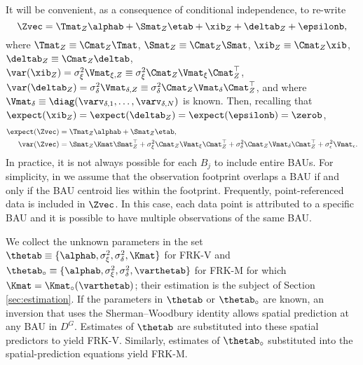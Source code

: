 

It will be convenient, as a consequence of conditional independence, to re-write
\begin{equation}\label{eq:Z_collapsed}
\Zvec = \Tmat_Z\alphab + \Smat_Z\etab + \xib_Z + \deltab_Z + \epsilonb,
\end{equation}
where $\Tmat_Z \equiv \Cmat_Z \Tmat$, $\Smat_Z \equiv \Cmat_Z \Smat$, $\xib_Z \equiv \Cmat_Z \xib$, $\deltab_Z \equiv \Cmat_Z \deltab$, $\var(\xib_Z) = \sigma^2_\xi\Vmat_{\xi,Z} \equiv \sigma^2_\xi\Cmat_Z\Vmat_{\xi}\Cmat_Z^\top$, $\var(\deltab_Z) = \sigma^2_\delta\Vmat_{\delta,Z} \equiv \sigma^2_\delta\Cmat_Z\Vmat_\delta\Cmat_Z^\top$, and where $\Vmat_\delta \equiv \diag(\varv_{\delta,1},\dots,\varv_{\delta,N})$ is known. Then, recalling that $\expect(\xib_Z) = \expect(\deltab_Z) = \expect(\epsilonb) = \zerob$,
\begin{align*}
\expect(\Zvec) &=\Tmat_Z\alphab + \Smat_Z\etab,\\
\var(\Zvec) &= \Smat_Z\Kmat\Smat_Z^\top + \sigma^2_\xi\Cmat_Z\Vmat_{\xi}\Cmat_Z^\top +  \sigma^2_\delta\Cmat_Z\Vmat_\delta\Cmat_Z^\top + \sigma^2_\epsilon\Vmat_\epsilon.
\end{align*}
In practice, it is not always possible for each $B_j$ to include entire BAUs. For simplicity, in  we assume that the observation footprint overlaps a BAU if and only if the BAU centroid lies within the footprint. Frequently, point-referenced data is included in $\Zvec$. In this case, each data point is attributed to a specific BAU and it is possible to have multiple observations of the same BAU.


We collect the unknown parameters in the set $\thetab \equiv \{\alphab, \sigma^2_\xi, \sigma^2_\delta, \Kmat\}$ for FRK-V and $\thetab_\circ \equiv \{\alphab, \sigma^2_\xi, \sigma^2_\delta, \varthetab\}$ for FRK-M for which $\Kmat = \Kmat_\circ(\varthetab)$; their estimation is the subject of Section \ref{sec:estimation}. If the parameters in $\thetab$ or $\thetab_\circ$ are known, an inversion that uses the Sherman--Woodbury identity \citep{Henderson_1981} allows spatial prediction at any BAU in $D^G$. Estimates of $\thetab$ are substituted into these spatial predictors to yield FRK-V. Similarly, estimates of $\thetab_\circ$ substituted into the spatial-prediction equations yield FRK-M.

